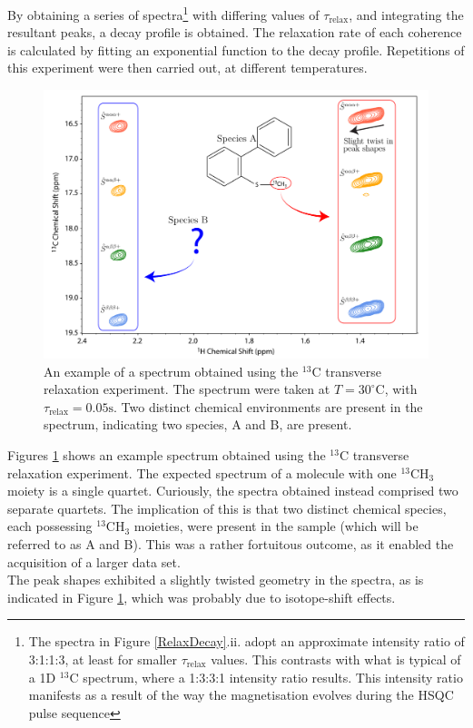 By obtaining a series of spectra\footnote{The spectra in Figure \ref{RelaxDecay}.ii. adopt an approximate intensity ratio of 3:1:1:3, at least for smaller $\tau_{\text{relax}}$ values. This contrasts with what is typical of a 1D $^{13}$C spectrum, where a 1:3:3:1 intensity ratio results. This intensity ratio manifests as a result of the way the magnetisation evolves during the HSQC pulse sequence\cite{RN49}} with differing values of $\tau_{\text{relax}}$, and integrating the resultant peaks, a decay profile is obtained. The relaxation rate of each coherence is calculated by fitting an exponential function to the decay profile. Repetitions of this experiment were then carried out, at different temperatures.\\
\begin{figure}
\centering
\includegraphics[scale=0.5]{./Figures/SimonsFigs/13CTransExptSpectrum.pdf}
\caption{An example of a spectrum obtained using the $^{13}$C transverse relaxation experiment. The spectrum were taken at $T = \num{30}^{\circ}\text{C}$, with $\tau_{\text{relax}} = \num{0.05} \si{\second}$. Two distinct chemical environments are present in the spectrum, indicating two species, A and B, are present.}
\label{TransverseSpectra}
\end{figure}
Figures \ref{TransverseSpectra} shows an example spectrum obtained using the $^{13}$C transverse relaxation experiment. The expected spectrum of a molecule with one $^{13}$CH$_3$ moiety is a single quartet. Curiously, the spectra obtained instead comprised two separate quartets. The implication of this is that two distinct chemical species, each possessing $^{13}$CH$_3$ moieties, were present in the sample (which will be referred to as A and B). This was a rather fortuitous outcome, as it enabled the acquisition of a larger data set.\\
The peak shapes exhibited a slightly twisted geometry in the spectra, as is indicated in Figure \ref{TransverseSpectra}, which was probably due to isotope-shift effects.\\
